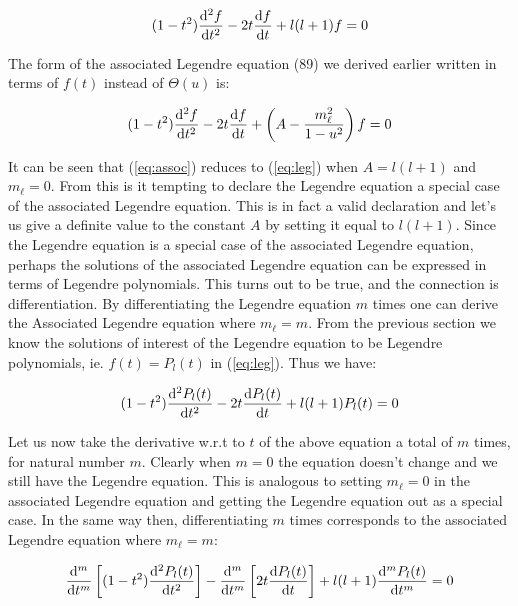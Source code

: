 \documentclass{article}
\begin{document}
    \begin{equation}
        \label{eq:leg}
        (1 - t^2)\odv[order = 2]{f}{t} - 2t\odv{f}{t} + l(l + 1)f = 0
    \end{equation}

    The form of the associated Legendre equation (89) we derived earlier written in terms of $f(t)$ instead of $\Theta(u)$ is:

    \begin{equation}
        \label{eq:assoc}
        (1 - t^2)\odv[order = 2]{f}{t} - 2t\odv{f}{t} + \left( A - \frac{m_\ell^2}{1 - u^2} \right)f = 0
    \end{equation}

    It can be seen that (\ref{eq:assoc}) reduces to (\ref{eq:leg}) when $A = l(l + 1)$ and $m_\ell = 0$. From this is it tempting to declare the Legendre equation a special case of 
    the associated Legendre equation. This is in fact a valid declaration and let's us give a definite value to the constant $A$ by setting it equal to $l(l + 1)$. Since the Legendre
    equation is a special case of the associated Legendre equation, perhaps the solutions of the associated Legendre equation can be expressed in terms of Legendre polynomials. This
    turns out to be true, and the connection is differentiation. By differentiating the Legendre equation $m$ times one can derive the Associated Legendre equation where $m_\ell = m$.
    From the previous section we know the solutions of interest of the Legendre equation to be Legendre polynomials, ie. $f(t) = P_l(t)$ in (\ref{eq:leg}). Thus we have:

    \begin{equation}
        (1 - t^2)\odv[order = 2]{P_l(t)}{t} - 2t\odv{P_l(t)}{t} + l(l + 1)P_l(t) = 0
    \end{equation}

    Let us now take the derivative w.r.t to $t$ of the above equation a total of $m$ times, for natural number $m$. Clearly when $m = 0$ the equation doesn't change and we still
    have the Legendre equation. This is analogous to setting $m_\ell = 0$ in the associated Legendre equation and getting the Legendre equation out as a special case. In the same
    way then, differentiating $m$ times corresponds to the associated Legendre equation where $m_\ell = m$:

    \begin{equation}
        \odv[order = m]{}{t}\left[ (1 - t^2)\odv[order = 2]{P_l(t)}{t} \right] - \odv[order = m]{}{t}\left[ 2t\odv{P_l(t)}{t} \right] + l(l+1)\odv[order = m]{P_l(t)}{t} = 0
    \end{equation}
\end{document}
